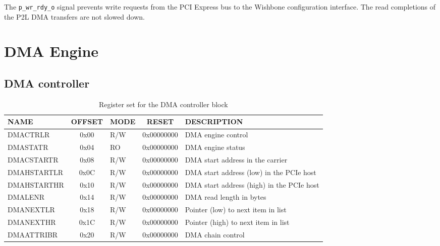 \documentclass[10pt,a4paper]{cerndoc}
\begin{document}
The \verb+p_wr_rdy_o+ signal prevents write requests from the PCI Express bus to the
Wishbone configuration interface.
The read completions of the P2L DMA transfers are not slowed down.





\section{DMA Engine}

\subsection{DMA controller}

\begin{table}[htbp]
  \centering
  \begin{tabularx}{\textwidth}{|l|c|l|c|X|}                                                   \hline
    \textbf{NAME}  & \textbf{OFFSET} & \textbf{MODE} & \textbf{RESET} & \textbf{DESCRIPTION}  \\ \hline \hline
    DMACTRLR       & 0x00 & R/W & 0x00000000 & DMA engine control                                       \\ \hline
    DMASTATR       & 0x04 & RO  & 0x00000000 & DMA engine status                                              \\ \hline
    DMACSTARTR     & 0x08 & R/W & 0x00000000 & DMA start address in the carrier                               \\ \hline
    DMAHSTARTLR    & 0x0C & R/W & 0x00000000 & DMA start address (low) in the PCIe host                       \\ \hline
    DMAHSTARTHR    & 0x10 & R/W & 0x00000000 & DMA start address (high) in the PCIe host                      \\ \hline
    DMALENR        & 0x14 & R/W & 0x00000000 & DMA read length in bytes                                       \\ \hline
    DMANEXTLR      & 0x18 & R/W & 0x00000000 & Pointer (low) to next item in list                             \\ \hline
    DMANEXTHR      & 0x1C & R/W & 0x00000000 & Pointer (high) to next item in list                            \\ \hline
    DMAATTRIBR     & 0x20 & R/W & 0x00000000 & DMA chain control                                              \\ \hline
  \end{tabularx}
  \caption{Register set for the DMA controller block}
  \label{tab:dma_control}
\end{table}
\end{document}
